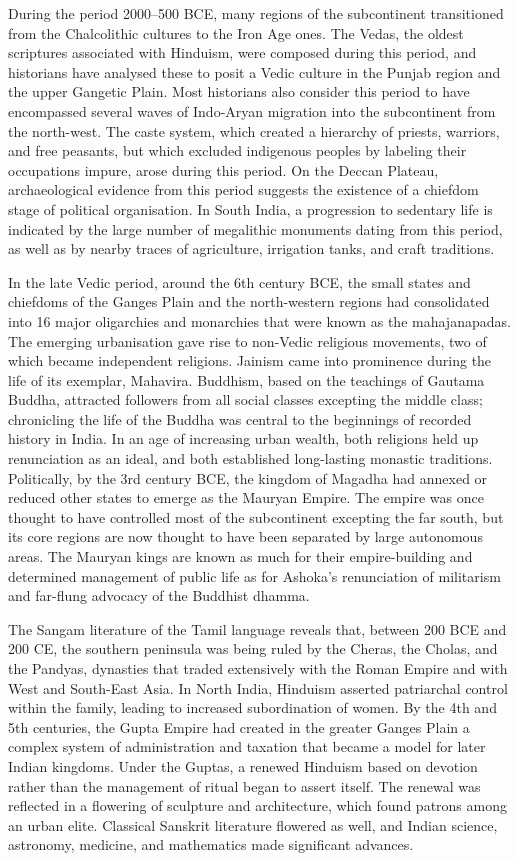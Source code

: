 During the period 2000--500 BCE, many regions of the subcontinent
transitioned from the Chalcolithic cultures to the Iron Age ones. The
Vedas, the oldest scriptures associated with Hinduism, were composed
during this period, and historians have analysed these to posit a Vedic
culture in the Punjab region and the upper Gangetic Plain. Most
historians also consider this period to have encompassed several waves
of Indo-Aryan migration into the subcontinent from the north-west. The
caste system, which created a hierarchy of priests, warriors, and free
peasants, but which excluded indigenous peoples by labeling their
occupations impure, arose during this period. On the Deccan Plateau,
archaeological evidence from this period suggests the existence of a
chiefdom stage of political organisation. In South India, a progression
to sedentary life is indicated by the large number of megalithic
monuments dating from this period, as well as by nearby traces of
agriculture, irrigation tanks, and craft traditions.

In the late Vedic period, around the 6th century BCE, the small states
and chiefdoms of the Ganges Plain and the north-western regions had
consolidated into 16 major oligarchies and monarchies that were known as
the mahajanapadas. The emerging urbanisation gave rise to non-Vedic
religious movements, two of which became independent religions. Jainism
came into prominence during the life of its exemplar, Mahavira.
Buddhism, based on the teachings of Gautama Buddha, attracted followers
from all social classes excepting the middle class; chronicling the life
of the Buddha was central to the beginnings of recorded history in
India. In an age of increasing urban wealth, both religions held up
renunciation as an ideal, and both established long-lasting monastic
traditions. Politically, by the 3rd century BCE, the kingdom of Magadha
had annexed or reduced other states to emerge as the Mauryan Empire. The
empire was once thought to have controlled most of the subcontinent
excepting the far south, but its core regions are now thought to have
been separated by large autonomous areas. The Mauryan kings are known as
much for their empire-building and determined management of public life
as for Ashoka's renunciation of militarism and far-flung advocacy of the
Buddhist dhamma.

The Sangam literature of the Tamil language reveals that, between 200
BCE and 200 CE, the southern peninsula was being ruled by the Cheras,
the Cholas, and the Pandyas, dynasties that traded extensively with the
Roman Empire and with West and South-East Asia. In North India, Hinduism
asserted patriarchal control within the family, leading to increased
subordination of women. By the 4th and 5th centuries, the Gupta Empire
had created in the greater Ganges Plain a complex system of
administration and taxation that became a model for later Indian
kingdoms. Under the Guptas, a renewed Hinduism based on devotion rather
than the management of ritual began to assert itself. The renewal was
reflected in a flowering of sculpture and architecture, which found
patrons among an urban elite. Classical Sanskrit literature flowered as
well, and Indian science, astronomy, medicine, and mathematics made
significant advances.


